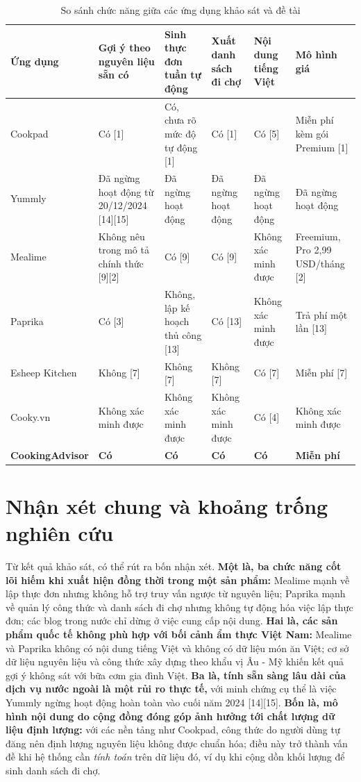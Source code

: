 \begin{table}[H]
\centering
\caption{So sánh chức năng giữa các ứng dụng khảo sát và đề tài}
\label{tab:khao-sat}
\begin{tabularx}{\textwidth}{|P{1.9cm}|Y|Y|Y|P{1.5cm}|Y|}
\hline
\bfseries Ứng dụng & \bfseries Gợi ý theo nguyên liệu sẵn có &
\bfseries Sinh thực đơn tuần tự động & \bfseries Xuất danh sách đi chợ &
\bfseries Nội dung tiếng Việt & \bfseries Mô hình giá \\ \hline
Cookpad & Có [1] & Có, chưa rõ mức độ tự động [1] & Có [1] & Có [5] &
  Miễn phí kèm gói Premium [1] \\ \hline
Yummly & Đã ngừng hoạt động từ 20/12/2024 [14][15] & Đã ngừng hoạt động &
  Đã ngừng hoạt động & Đã ngừng hoạt động & Đã ngừng hoạt động \\ \hline
Mealime & Không nêu trong mô tả chính thức [9][2] & Có [9] & Có [9] &
  Không xác minh được & Freemium, Pro 2,99 USD/tháng [2] \\ \hline
Paprika & Có [3] & Không, lập kế hoạch thủ công [13] & Có [13] &
  Không xác minh được & Trả phí một lần [13] \\ \hline
Esheep Kitchen & Không [7] & Không [7] & Không [7] & Có [7] & Miễn phí [7] \\ \hline
Cooky.vn & Không xác minh được & Không xác minh được &
  Không xác minh được & Có [4] & Không xác minh được \\ \hline
\bfseries Cooking\-Advisor & \bfseries Có & \bfseries Có & \bfseries Có &
  \bfseries Có & \bfseries Miễn phí \\ \hline
\end{tabularx}
\end{table}

\section{Nhận xét chung và khoảng trống nghiên cứu}
\label{sec:khoang-trong}

Từ kết quả khảo sát, có thể rút ra bốn nhận xét. \textbf{Một là, ba chức năng
cốt lõi hiếm khi xuất hiện đồng thời trong một sản phẩm:} Mealime mạnh về lập
thực đơn nhưng không hỗ trợ truy vấn ngược từ nguyên liệu; Paprika mạnh về quản
lý công thức và danh sách đi chợ nhưng không tự động hóa việc lập thực đơn; các
blog trong nước chỉ dừng ở việc cung cấp nội dung. \textbf{Hai là, các sản phẩm
quốc tế không phù hợp với bối cảnh ẩm thực Việt Nam:} Mealime và Paprika không
có nội dung tiếng Việt và không có dữ liệu món ăn Việt; cơ sở dữ liệu nguyên
liệu và công thức xây dựng theo khẩu vị Âu - Mỹ khiến kết quả gợi ý không sát
với bữa cơm gia đình Việt. \textbf{Ba là, tính sẵn sàng lâu dài của dịch vụ nước
ngoài là một rủi ro thực tế,} với minh chứng cụ thể là việc Yummly ngừng hoạt
động hoàn toàn vào cuối năm 2024 [14][15]. \textbf{Bốn là, mô hình nội dung do
cộng đồng đóng góp ảnh hưởng tới chất lượng dữ liệu định lượng:} với các nền
tảng như Cookpad, công thức do người dùng tự đăng nên định lượng nguyên liệu
không được chuẩn hóa; điều này trở thành vấn đề khi hệ thống cần \textit{tính
toán} trên dữ liệu đó, ví dụ khi cộng dồn khối lượng để sinh danh sách đi chợ.

